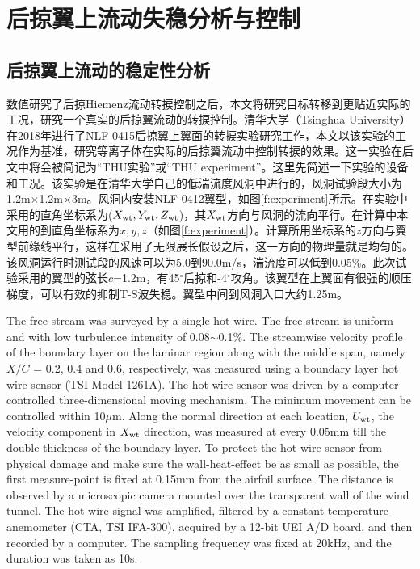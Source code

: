 \chapter{后掠翼上流动失稳分析与控制}
\section{后掠翼上流动的稳定性分析}
数值研究了后掠Hiemenz流动转捩控制之后，本文将研究目标转移到更贴近实际的工况，研究一个真实的后掠翼流动的转捩控制。清华大学（Tsinghua University）在2018年进行了NLF-0415后掠翼上翼面的转捩实验研究工作\cite{wang2018}，本文以该实验的工况作为基准，研究等离子体在实际的后掠翼流动中控制转捩的效果。这一实验在后文中将会被简记为``THU实验''或``THU experiment''。这里先简述一下实验的设备和工况。该实验是在清华大学自己的低湍流度风洞中进行的，风洞试验段大小为1.2m$\times$1.2m$\times$3m。风洞内安装NLF-0412翼型，如图\ref{f:experiment}所示。在实验中采用的直角坐标系为($X_{\rm wt},Y_{\rm wt},Z_{\rm wt}$)，其$X_{\rm wt}$方向与风洞的流向平行。在计算中本文用的到直角坐标系为$x,y,z$（如图\ref{f:experiment}）。计算所用坐标系的$z$方向与翼型前缘线平行，这样在采用了无限展长假设之后，这一方向的物理量就是均匀的。该风洞运行时测试段的风速可以为5.0到90.0m/s，湍流度可以低到0.05\%。此次试验采用的翼型的弦长$c$=1.2m，有45$^\circ$后掠和-4$^\circ$攻角。该翼型在上翼面有很强的顺压梯度，可以有效的抑制T-S波失稳\cite{Dagenhart1999}。翼型中间到风洞入口大约1.25m。

The free stream was surveyed by a single hot wire. The free stream is uniform and with low turbulence intensity of 0.08$\sim$0.1\%. The streamwise velocity profile of the boundary layer on the laminar region along with the middle span, namely $X/C$ = 0.2, 0.4 and 0.6, respectively, was measured using a boundary layer hot wire sensor (TSI Model 1261A). The hot wire sensor was driven by a computer controlled three-dimensional moving mechanism. The minimum movement can be controlled within 10$\mu$m. Along the normal direction at each location, $U_{\rm wt}$, the velocity component in $X_{\rm wt}$ direction, was measured at every 0.05mm till the double thickness of the boundary layer. To protect the hot wire sensor from physical damage and make sure the wall-heat-effect be as small as possible, the first measure-point is fixed at 0.15mm from the airfoil surface. The distance is observed by a microscopic camera mounted over the transparent wall of the wind tunnel. The hot wire signal was amplified, filtered by a constant temperature anemometer (CTA, TSI IFA-300), acquired by a 12-bit UEI A/D board, and then recorded by a computer. The sampling frequency was fixed at 20kHz, and the duration was taken as 10s.

